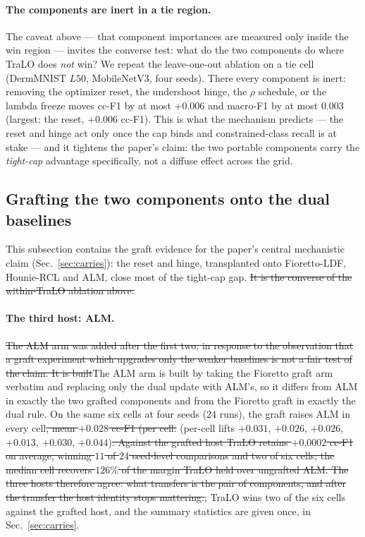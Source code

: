\documentclass[10pt]{article}
\newcommand{\del}[1]{{\color{red}\sout{#1}}}
\begin{document}
{\color{blue}
\paragraph{The components are inert in a tie region.}
The caveat above --- that component importances are measured only inside the win
region --- invites the converse test: what do the two components do where TraLO does
\emph{not} win? We repeat the leave-one-out ablation on a tie cell (DermMNIST $L50$,
MobileNetV3, four seeds). There every component is inert: removing the optimizer
reset, the undershoot hinge, the $\rho$ schedule, or the lambda freeze moves cc-F1 by
at most $+0.006$ and macro-F1 by at most $0.003$ (largest: the reset, $+0.006$ cc-F1).
This is what the mechanism predicts --- the reset and hinge act only once the cap binds
and constrained-class recall is at stake --- and it tightens the paper's claim: the two
portable components carry the \emph{tight-cap} advantage specifically, not a diffuse
effect across the grid.}



\subsection{Grafting the two components onto the dual baselines}
\label{app:graft}

This subsection contains the graft evidence for the paper's central
mechanistic claim (Sec.~\ref{sec:carries}): the reset and hinge,
transplanted onto Fioretto-LDF{\color{blue},} Hounie-RCL{\color{blue} and ALM},
close most of the
tight-cap gap. \del{It is the converse of the within-TraLO ablation above.}

{\color{blue}
\paragraph{The third host: ALM.}
\del{The ALM arm was added after the first two, in response to the observation that a
graft experiment which upgrades only the weaker baselines is not a fair test of
the claim. It is built}{The ALM arm is built} by taking the Fioretto graft arm verbatim and replacing
only the dual update with ALM's, so it differs from ALM in exactly the two
grafted components and from the Fioretto graft in exactly the dual rule. On the
same six cells at four seeds ($24$ runs), the graft raises ALM in every cell\del{,
mean $+0.028$ cc-F1 (per cell:}{ (per-cell lifts} $+0.031$, $+0.026$, $+0.026$, $+0.013$, $+0.030$,
$+0.044$)\del{. Against the grafted host TraLO retains $+0.0002$ cc-F1 on average,
winning $11$ of $24$ seed-level comparisons and two of six cells; the median cell
recovers $126\%$ of the margin TraLO held over ungrafted ALM. The three hosts
therefore agree: what transfers is the pair of components, and after the transfer
the host identity stops mattering.}{; TraLO wins two of the six cells against the
grafted host, and the summary statistics are given once, in
Sec.~\ref{sec:carries}.}}
\end{document}
